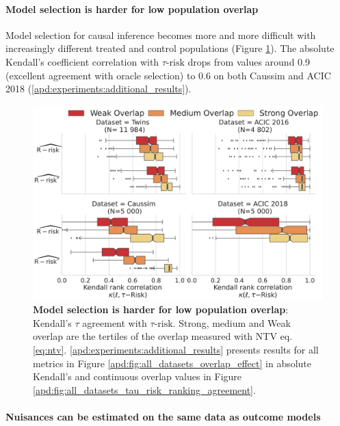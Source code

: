 \documentclass[10pt,twocolumn]{article}
\begin{document}
\paragraph{Model selection is harder for low population
    overlap}

Model selection for causal inference becomes more and more difficult with
increasingly different treated and control populations (Figure
\ref{fig:all_datasets_overlap_effect_r_risk}). The absolute Kendall's
coefficient correlation with $\tau\text{-risk}$ drops from values around 0.9
(excellent agreement with oracle selection) to 0.6 on both Caussim and ACIC 2018
(\ref{apd:experiments:additional_results}).

\begin{figure}[!h]
    \centering
    \includegraphics[width=\linewidth]{images/_2_overlap_influence_overlap_by_bin_comparaison_kendall_by_Dataset_r_risk_only_twocols.pdf}
    \caption{\textbf{Model selection is harder for low population
            overlap}:
        Kendall's $\tau$ agreement with $\tau\text{-risk}$. Strong, medium and Weak overlap
        are the tertiles of the overlap measured with NTV eq. \ref{eq:ntv}. \ref{apd:experiments:additional_results} presents results for all
        metrics in Figure \ref{apd:fig:all_datasets_overlap_effect} in absolute
        Kendall's and continuous overlap values in Figure
            {\ref{apd:fig:all_datasets_tau_risk_ranking_agreement}}.}\label{fig:all_datasets_overlap_effect_r_risk}
\end{figure}



\paragraph{Nuisances can be estimated on the same data as outcome models}
\end{document}
